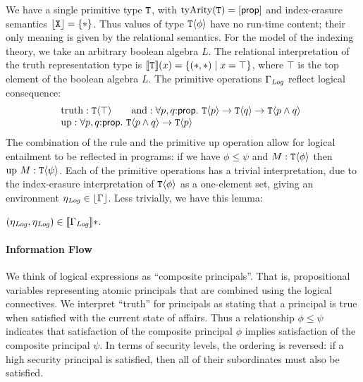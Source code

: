 We have a single primitive type $\textup{\texttt{T}}$, with
$\mathrm{tyArity}(\textup{\texttt{T}}) = [\mathsf{prop}]$ and index-erasure
semantics $\left\lfloor \textup{\texttt{X}} \right\rfloor = \{ * \}$. Thus values of type
$\textup{\texttt{T}}\langle \phi \rangle$ have no run-time content; their only meaning is
given by the relational semantics. For the model of the indexing
theory, we take an arbitrary boolean algebra $L$. The relational
interpretation of the truth representation type is
$\llbracket \textup{\texttt{T}} \rrbracket(x) = \{ (*,*) \mathrel| x = \top \}$, where $\top$
is the top element of the boolean algebra $L$. The primitive
operations $\Gamma_{\mathit{Log}}$ reflect logical consequence:
\begin{displaymath}
  \begin{array}{l}
  \begin{array}{@{}c@{\hspace{2em}}c}
    \mathrm{truth} : \tyPrim{T}{\top} &
    \mathrm{and}   : \forall p, q\mathord:\mathsf{prop}.\ \tyPrim{T}{p} \to \tyPrim{T}{q} \to \tyPrim{T}{p \land q}
  \end{array} \\
  \mathrm{up} : \forall p, q\mathord:\mathsf{prop}.\ \tyPrim{T}{p \land q} \to \tyPrim{T}{p}
\end{array}
\end{displaymath}
The combination of the  rule and the primitive
$\mathrm{up}$ operation allow for logical entailment to be reflected
in programs: if we have $\phi \leq \psi$ and $M : \textup{\texttt{T}}\langle \phi \rangle$
then $\mathrm{up}\ M : \textup{\texttt{T}}\langle \psi \rangle$. Each of the primitive
operations has a trivial interpretation, due to the index-erasure
interpretation of $\textup{\texttt{T}}\langle \phi \rangle$ as a one-element set, giving an
environment $\eta_{\mathit{Log}} \in \left\lfloor \Gamma \right\rfloor$. Less trivially, we
have this lemma:
\begin{lemma}\label{lem:environments-information-flow}
  $(\eta_{\mathit{Log}}, \eta_{\mathit{Log}}) \in \llbracket \Gamma_{\mathit{Log}} \rrbracket{}*$.
\end{lemma}

\paragraph{Information Flow} We think of logical expressions as
``composite principals''. That is, propositional variables representing
atomic principals that are combined using the logical connectives. We
interpret ``truth'' for principals as stating that a principal is true
when satisfied with the current state of affairs. Thus a relationship
$\phi \leq \psi$ indicates that satisfaction of the composite
principal $\phi$ implies satisfaction of the composite principal
$\psi$. In terms of security levels, the ordering is reversed: if a
high security principal is satisfied, then all of their subordinates
must also be satisfied.

